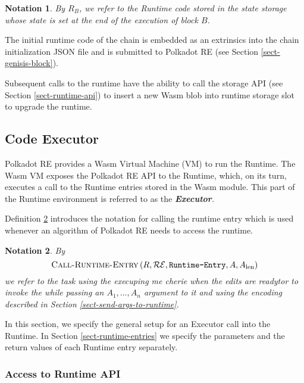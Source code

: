 \documentclass{article}
\newcommand{\tmem}[1]{{\em #1\/}}
\newcommand{\tmname}[1]{\textsc{#1}}
\newcommand{\tmop}[1]{\ensuremath{\operatorname{#1}}}
\newcommand{\tmstrong}[1]{\textbf{#1}}
\newcommand{\tmtextbf}[1]{{\bfseries{#1}}}
\newcommand{\tmtextit}[1]{{\itshape{#1}}}
\newcommand{\tmtextsc}[1]{{\scshape{#1}}}
\newcommand{\tmtexttt}[1]{{\ttfamily{#1}}}
\newcommand{\tmverbatim}[1]{{\ttfamily{#1}}}
\newtheorem{notation}{Notation}
\providecommand{\tmem}[1]{\tmtextit{#1}}
\providecommand{\tmname}[1]{\tmtextsc{#1}}
\providecommand{\tmop}[1]{\ensuremath{\mathrm{#1}}}
\providecommand{\tmstrong}[1]{\tmtextbf{#1}}
\providecommand{\tmtextbf}[1]{\tmtextbf{#1}}
\providecommand{\tmtextit}[1]{\tmtextit{#1}}
\providecommand{\tmverbatim}[1]{\tmtexttt{#1}}
\newtheorem{notation}{Notation}
\begin{document}
\begin{notation}
  \label{nota-runtime-code-at-state}By $R_B$, we refer to the Runtime code
  stored in the state storage whose state is set at the end of the execution
  of block $B$.
\end{notation}

The initial runtime code of the chain is embedded as an extrinsics into the
chain initialization JSON file and is submitted to Polkadot RE (see Section
\ref{sect-genisis-block}).

Subsequent calls to the runtime have the ability to call the storage API (see
Section \ref{sect-runtime-api}) to insert a new Wasm blob into runtime storage
slot to upgrade the runtime.

\subsection{Code Executor}

Polkadot RE provides a Wasm Virtual Machine (VM) to run the Runtime. The Wasm
VM exposes the Polkadot RE API to the Runtime, which, on its turn, executes a
call to the Runtime entries stored in the Wasm module. This part of the
Runtime environment is referred to as the {\tmem{{\tmstrong{Executor}}.}}

Definition \ref{nota-call-into-runtime} introduces the notation for calling
the runtime entry which is used whenever an algorithm of Polkadot RE needs to
access the runtime.

\begin{notation}
  \label{nota-call-into-runtime} By
  \[ \text{{\tmname{Call-Runtime-Entry}}} \left( R, \mathcal{R}\mathcal{E},
     \text{\tmverbatim{Runtime-Entry}}, A, A_{\tmop{len}} \right) \]
  we refer to the task using the execuping me cherie when the edits are
  readytor to invoke the \tmverbatim{Runtime-Entry} while passing an $A_1,
  \ldots, A_n$ argument to it and using the encoding described in Section
  \ref{sect-send-args-to-runtime}.
\end{notation}

In this section, we specify the general setup for an Executor call into the
Runtime. In Section \ref{sect-runtime-entries} we specify the parameters and
the return values of each Runtime entry separately.

\subsubsection{Access to Runtime API}
\end{document}
